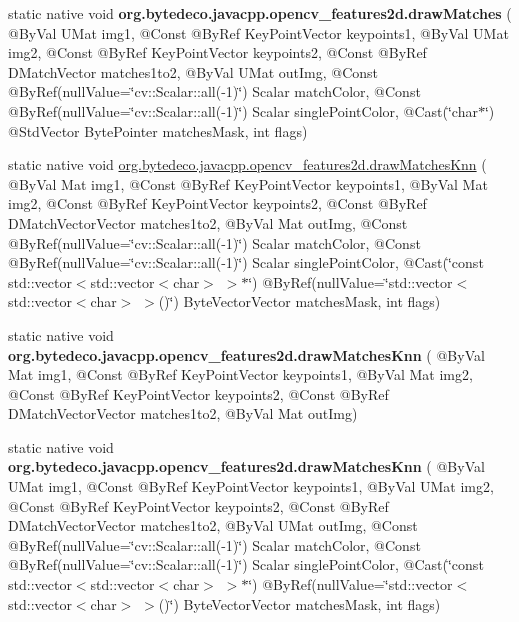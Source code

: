 \begin{DoxyCompactItemize}
\item 
\mbox{\label{group__features2d__draw_gabfbc5fb5f7d6adacedf1844020fbce3d}} 
static native void {\bfseries org.\+bytedeco.\+javacpp.\+opencv\+\_\+features2d.\+draw\+Matches} ( @By\+Val U\+Mat img1, @Const @By\+Ref Key\+Point\+Vector keypoints1, @By\+Val U\+Mat img2, @Const @By\+Ref Key\+Point\+Vector keypoints2, @Const @By\+Ref D\+Match\+Vector matches1to2, @By\+Val U\+Mat out\+Img, @Const @By\+Ref(null\+Value=\char`\"{}cv\+::\+Scalar\+::all(-\/1)\char`\"{}) Scalar match\+Color, @Const @By\+Ref(null\+Value=\char`\"{}cv\+::\+Scalar\+::all(-\/1)\char`\"{}) Scalar single\+Point\+Color, @Cast(\char`\"{}char$\ast$\char`\"{}) @Std\+Vector Byte\+Pointer matches\+Mask, int flags)
\item 
static native void \hyperlink{group__features2d__draw_ga685267fdd3340d65fba4cf402d6dbe04}{org.\+bytedeco.\+javacpp.\+opencv\+\_\+features2d.\+draw\+Matches\+Knn} ( @By\+Val Mat img1, @Const @By\+Ref Key\+Point\+Vector keypoints1, @By\+Val Mat img2, @Const @By\+Ref Key\+Point\+Vector keypoints2, @Const @By\+Ref D\+Match\+Vector\+Vector matches1to2, @By\+Val Mat out\+Img, @Const @By\+Ref(null\+Value=\char`\"{}cv\+::\+Scalar\+::all(-\/1)\char`\"{}) Scalar match\+Color, @Const @By\+Ref(null\+Value=\char`\"{}cv\+::\+Scalar\+::all(-\/1)\char`\"{}) Scalar single\+Point\+Color, @Cast(\char`\"{}const std\+::vector$<$std\+::vector$<$char$>$ $>$$\ast$\char`\"{}) @By\+Ref(null\+Value=\char`\"{}std\+::vector$<$std\+::vector$<$char$>$ $>$()\char`\"{}) Byte\+Vector\+Vector matches\+Mask, int flags)
\item 
\mbox{\label{group__features2d__draw_ga92c9b6aad2c7b0bf85ce4050cee96f35}} 
static native void {\bfseries org.\+bytedeco.\+javacpp.\+opencv\+\_\+features2d.\+draw\+Matches\+Knn} ( @By\+Val Mat img1, @Const @By\+Ref Key\+Point\+Vector keypoints1, @By\+Val Mat img2, @Const @By\+Ref Key\+Point\+Vector keypoints2, @Const @By\+Ref D\+Match\+Vector\+Vector matches1to2, @By\+Val Mat out\+Img)
\item 
\mbox{\label{group__features2d__draw_ga997ae8ba73831b26f6399a21aae276f9}} 
static native void {\bfseries org.\+bytedeco.\+javacpp.\+opencv\+\_\+features2d.\+draw\+Matches\+Knn} ( @By\+Val U\+Mat img1, @Const @By\+Ref Key\+Point\+Vector keypoints1, @By\+Val U\+Mat img2, @Const @By\+Ref Key\+Point\+Vector keypoints2, @Const @By\+Ref D\+Match\+Vector\+Vector matches1to2, @By\+Val U\+Mat out\+Img, @Const @By\+Ref(null\+Value=\char`\"{}cv\+::\+Scalar\+::all(-\/1)\char`\"{}) Scalar match\+Color, @Const @By\+Ref(null\+Value=\char`\"{}cv\+::\+Scalar\+::all(-\/1)\char`\"{}) Scalar single\+Point\+Color, @Cast(\char`\"{}const std\+::vector$<$std\+::vector$<$char$>$ $>$$\ast$\char`\"{}) @By\+Ref(null\+Value=\char`\"{}std\+::vector$<$std\+::vector$<$char$>$ $>$()\char`\"{}) Byte\+Vector\+Vector matches\+Mask, int flags)

\end{DoxyCompactItemize}
